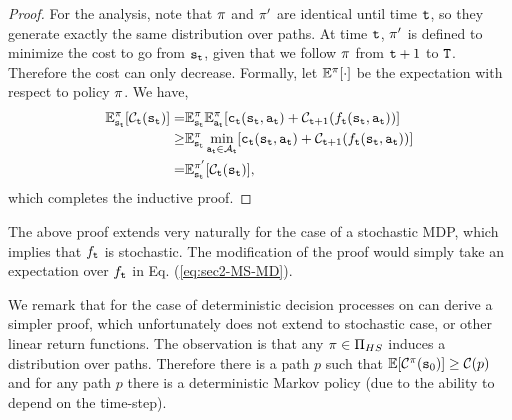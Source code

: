 \begin{proof}
For the analysis, note that $\pi$ and $\pi'$ are identical
until time ${\tt t}$, so they generate exactly the same distribution
over paths. At time ${\tt t}$, $\pi'$ is defined to minimize the
cost to go from ${\tt s}_{\tt t}$, given that we follow $\pi$ from
${\tt t}+1$ to ${\tt T}$. Therefore the cost can only decrease.
Formally, let $\mathbb{E}^\pi[\cdot]$ be the expectation with respect to
policy $\pi$. We have,
\begin{align*}
\mathbb{E}^\pi_{{\tt s}_{\tt t}}[\mathcal{C}_{{\tt t}}({\tt s}_{\tt t})]
= & \mathbb{E}^\pi_{{\tt s}_{\tt t}}
\mathbb{E}^\pi_{{\tt a}_{\tt t}}[{\tt c}_{{\tt t}}({\tt s}_{\tt t},{\tt a}_{\tt t})+\mathcal{C}_{{\tt t}+1}(f_{\tt t}({\tt s}_{\tt t},{\tt a}_{\tt t}))]\\
\geq & \mathbb{E}^\pi_{{\tt s}_{\tt t}} \min_{{\tt a}_{\tt t}\in
\mathcal{A}_{\tt t}}[{\tt c}_{{\tt t}}({\tt s}_{\tt t},{\tt a}_{\tt t})+\mathcal{C}_{{\tt t}+1}(f_{\tt t}({\tt s}_{\tt t},{\tt a}_{\tt t}))]\\
= & \mathbb{E}^{\pi'}_{{\tt s}_{\tt t}} [\mathcal{C}_{\tt t} ({\tt s}_{\tt t})],
\end{align*}
which completes the inductive proof.
%
\end{proof}

\begin{remark}
The above proof extends very naturally for the case of a stochastic
MDP, which implies that $f_{\tt t}$ is stochastic. The modification
of the proof would simply take an expectation over $f_{\tt t}$ in
Eq. (\ref{eq:sec2-MS-MD}).
\end{remark}

\begin{remark}
 We remark that for the case of deterministic decision processes on can derive a simpler proof, which unfortunately does not extend to stochastic case, or other linear return functions. The observation is that any $\pi\in \Pi_{HS}$ induces a distribution over paths. Therefore there is a path $p$ such that $\mathbb{E}[\mathcal{C}^\pi({\tt s}_0)]\geq \mathcal{C}(p)$ and for any path $p$ there is a deterministic Markov policy (due to the ability to depend on the time-step).
 \end{remark}


